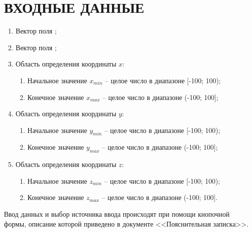 \documentclass[14pt,a4paper,final]{extreport}
\begin{document}
\chapter{ВХОДНЫЕ ДАННЫЕ}
\label{inpdata}
\begin{enumerate}
	\item Вектор поля \fieldA;
	\item Вектор поля \fieldB;
	\item Область определения координаты \( x \):
	\begin{enumerate}
		\item[а)] Начальное значение \( x_{min} \) -- целое число в диапазоне [-100; 100);
		\item[б)] Конечное значение \( x_{max} \) -- целое число в диапазоне (-100; 100];
	\end{enumerate}
	\item Область определения координаты \( y \):
	\begin{enumerate}
		\item[а)] Начальное значение \( y_{min} \) -- целое число в диапазоне [-100; 100);
		\item[б)] Конечное значение \( y_{max} \) -- целое число в диапазоне (-100; 100];
	\end{enumerate}
	\item Область определения координаты \( z \):
	\begin{enumerate}
		\item[а)] Начальное значение \( z_{min} \) -- целое число в диапазоне [-100; 100);
		\item[б)] Конечное значение \( z_{max} \) -- целое число в диапазоне (-100; 100].
	\end{enumerate}
\end{enumerate}
Ввод данных и выбор источника ввода происходят при помощи кнопочной формы,
описание которой приведено в документе <<Пояснительная записка>>.
\end{document}
